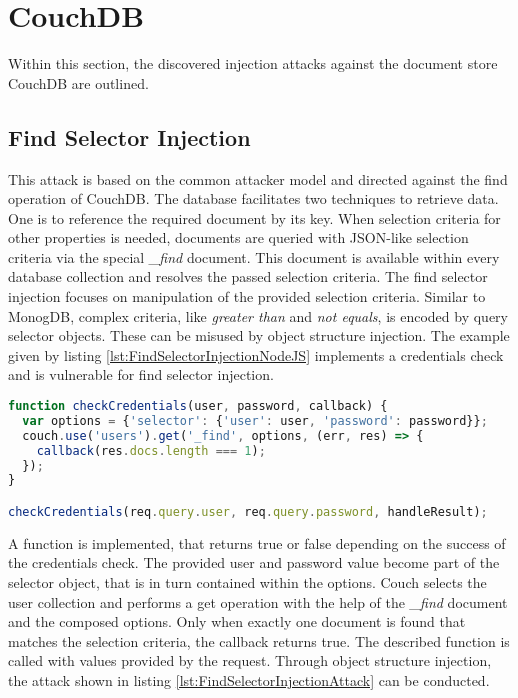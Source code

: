 \section{CouchDB}
Within this section, the discovered injection attacks against the document store CouchDB are outlined.

\subsection{Find Selector Injection}
This attack is based on the common attacker model and directed against the find operation of CouchDB. The database facilitates two techniques to retrieve data. One is to reference the required document by its key. When selection criteria for other properties is needed, documents are queried with JSON-like selection criteria via the special \emph{\_find} document. This document is available within every database collection and resolves the passed selection criteria. The find selector injection focuses on manipulation of the provided selection criteria. Similar to MonogDB, complex criteria, like \emph{greater than} and \emph{not equals}, is encoded by query selector objects. These can be misused by object structure injection. The example given by listing \ref{lst:FindSelectorInjectionNodeJS} implements a credentials check and is vulnerable for find selector injection. \\

\begin{lstlisting}[caption={Vulnerable NodeJS example for find selector injection on CouchDB}, label={lst:FindSelectorInjectionNodeJS}, language=JavaScript]
function checkCredentials(user, password, callback) {
  var options = {'selector': {'user': user, 'password': password}};
  couch.use('users').get('_find', options, (err, res) => {
    callback(res.docs.length === 1);
  });
}

checkCredentials(req.query.user, req.query.password, handleResult);
\end{lstlisting}

A function is implemented, that returns true or false depending on the success of the credentials check. The provided user and password value become part of the selector object, that is in turn contained within the options. Couch selects the user collection and performs a get operation with the help of the \emph{\_find} document and the composed options. Only when exactly one document is found that matches the selection criteria, the callback returns true. The described function is called with values provided by the request. Through object structure injection, the attack shown in listing \ref{lst:FindSelectorInjectionAttack} can be conducted. \\


